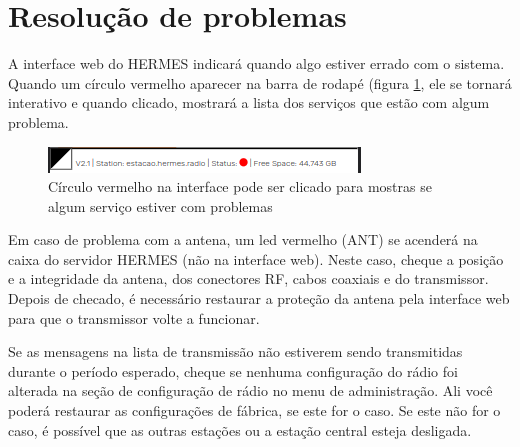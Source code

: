 \documentclass[11pt,a4paper]{article}
\begin{document}

\section{Resolução de problemas}

A interface web do HERMES indicará quando algo estiver errado com o sistema. Quando um círculo vermelho aparecer na barra de rodapé (figura \ref{fig:status}, ele se tornará interativo e quando clicado, mostrará a lista dos serviços que estão com algum problema.


\begin{figure}[H]
    \centering
    \includegraphics[width=0.8\columnwidth]{screenshots/frontend/en/status.png}
    	\caption{Círculo vermelho na interface pode ser clicado para mostras se algum serviço estiver com problemas}
    \label{fig:status}
\end{figure}

Em caso de problema com a antena, um led vermelho (ANT) se acenderá na caixa do servidor HERMES (não na interface web). Neste caso, cheque a posição e a integridade da antena, dos conectores RF, cabos coaxiais e do transmissor. Depois de checado, é necessário restaurar a proteção da antena pela interface web para que o transmissor volte a funcionar.


Se as mensagens na lista de transmissão não estiverem sendo transmitidas durante o período esperado, cheque se nenhuma configuração do rádio foi alterada na seção de configuração de rádio no menu de administração. Ali você poderá restaurar as configurações de fábrica, se este for o caso. Se este não for o caso, é possível que as outras estações ou a estação central esteja desligada.
\end{document}
